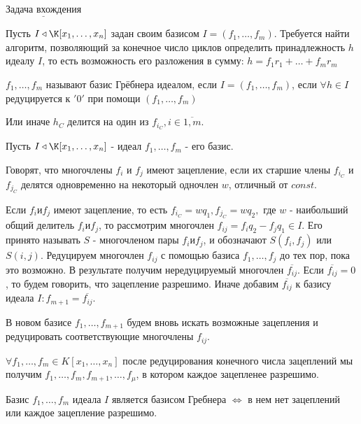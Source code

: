 $\underline{\text{Задача вхождения}}$ 

Пусть $I \triangleleft \K[x_1,\ldots,x_n]$ задан своим базисом $I = (f_1,\ldots,f_m)$. Требуется найти алгоритм, позволяющий за конечное число циклов определить принадлежность $h$ идеалу $I$, то есть возможность его разложения в сумму: $h = f_1r_1 + \ldots + f_mr_m$

\opr $f_1,\ldots,f_m$ называют базис Грёбнера идеалом, если $I = (f_1,\ldots,f_m)$, если $\forall h \in I$ редуцируется к $'0'$ при помощи $(f_1,\dots,f_m)$

Или иначе $h_C$ делится на один из $f_{i_C},i \in \overline{1,m}$.

Пусть $I \triangleleft \K[x_1,\ldots,x_n]$ - идеал $f_1,\ldots,f_m $ - его базис.

\opr Говорят, что многочлены $f_i$ и $f_j$ имеют зацепление, если их старшие члены $f_{i_C}$ и $f_{j_C}$ делятся одновременно на некоторый одночлен $w$, отличный от $const$.

Если $f_i и f_j$ имеют зацепление, то есть $f_{i_C} = wq_1, f_{j_C} = wq_2,$ где $w$ - наибольший общий делитель $f_i и f_j$, то рассмотрим многочлен $f_{ij} = f_iq_2 - f_jq_1 \in I$. Его принято называть $S$ - многочленом пары $f_i и f_j$, и обозначают $S(f_i,f_j)$ или $S(i,j)$. Редуцируем многочлен $f_{ij}$ с помощью базиса $f_1,\ldots,f_j$ до тех пор, пока это возможно. В результате получим нередуцируемый многочлен $\overline{f_{ij}}$. Если $\overline{f_{ij}} = 0$, то будем говорить, что зацепление разрешимо. Иначе добавим $\overline{f_{ij}}$ к базису идеала $I: f_{m+1} = \overline{f_{ij}}$.

В новом базисе $f_1,\ldots,f_{m+1}$ будем вновь искать возможные зацепления и редуцировать соответствующие многочлены $f_{ij}$.

\thr $\forall f_1,\ldots,f_m \in K[x_1,\ldots,x_n]$ после редуцирования конечного числа зацеплений мы получим $f_1,\ldots,f_m,f_{m+1},\ldots,f_\mu$, в котором каждое зацепленее разрешимо.

\thr Базис $f_1,\ldots,f_m$ идеала $I$ является базисом Гребнера $\Leftrightarrow$ в нем нет зацеплений или каждое зацепление разрешимо.

